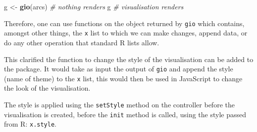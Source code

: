 \documentclass[
]{krantz}
\makeatletter
\newenvironment{Shaded}{\begin{snugshade}}{\end{snugshade}}
\newcommand{\CommentTok}[1]{\textcolor[rgb]{0.37,0.37,0.37}{\textit{#1}}}
\newcommand{\ControlFlowTok}[1]{\textcolor[rgb]{0.27,0.27,0.27}{\textbf{#1}}}
\newcommand{\DataTypeTok}[1]{\textcolor[rgb]{0.27,0.27,0.27}{#1}}
\newcommand{\KeywordTok}[1]{\textcolor[rgb]{0.27,0.27,0.27}{\textbf{#1}}}
\newcommand{\NormalTok}[1]{#1}
\newcommand{\OperatorTok}[1]{\textcolor[rgb]{0.43,0.43,0.43}{\textbf{#1}}}
\newcommand{\StringTok}[1]{\textcolor[rgb]{0.5,0.5,0.5}{#1}}
\newenvironment{kframe}{%
\medskip{}
\setlength{\fboxsep}{.8em}
 \def\at@end@of@kframe{}%
 \ifinner\ifhmode%
  \def\at@end@of@kframe{\end{minipage}}%
  \begin{minipage}{\columnwidth}%
 \fi\fi%
 \def\FrameCommand##1{\hskip\@totalleftmargin \hskip-\fboxsep
 \colorbox{shadecolor}{##1}\hskip-\fboxsep
     \hskip-\linewidth \hskip-\@totalleftmargin \hskip\columnwidth}%
 \MakeFramed {\advance\hsize-\width
   \@totalleftmargin\z@ \linewidth\hsize
   \@setminipage}}%
 {\par\unskip\endMakeFramed%
 \at@end@of@kframe}
\renewenvironment{Shaded}{\begin{kframe}}{\end{kframe}}
\makeatother
\begin{document}
\begin{Shaded}
\begin{Highlighting}[]
\NormalTok{g <{-}}\StringTok{ }\KeywordTok{gio}\NormalTok{(arcs) }\CommentTok{\# nothing renders}
\NormalTok{g }\CommentTok{\# visualisation renders}
\end{Highlighting}
\end{Shaded}

Therefore, one can use functions on the object returned by \texttt{gio} which contains, amongst other things, the \texttt{x} list to which we can make changes, append data, or do any other operation that standard R lists allow.

\begin{Shaded}
\end{Shaded}

This clarified the function to change the style of the visualisation can be added to the package. It would take as input the output of \texttt{gio} and append the style (name of theme) to the \texttt{x} list, this would then be used in JavaScript to change the look of the visualisation.

\begin{Shaded}
\end{Shaded}

The style is applied using the \texttt{setStyle} method on the controller before the visualisation is created, before the \texttt{init} method is called, using the style passed from R: \texttt{x.style}.
\end{document}
